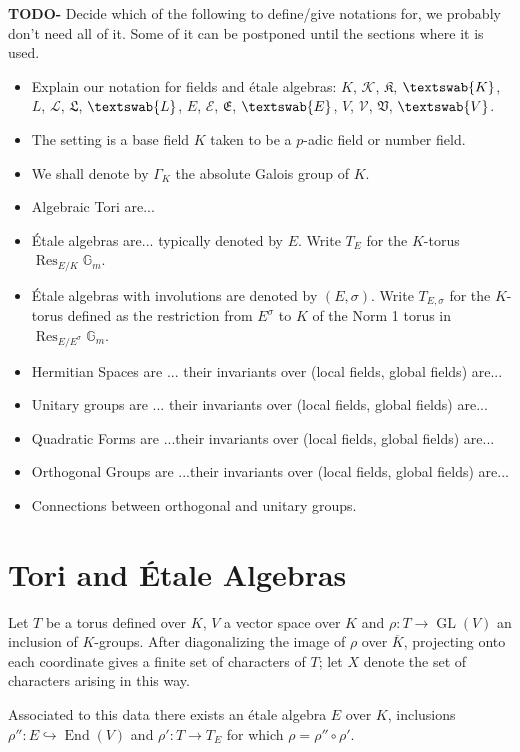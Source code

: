 \documentclass{article}
\theoremstyle{plain}
\theoremstyle{definition}
\DeclareMathOperator{\Res}{Res}
\DeclareMathOperator{\End}{End}
\DeclareMathOperator{\GL}{GL}
\newcommand{\Gm}{\mathbb{G}_m}
\newcommand{\GalKbK}{\Gamma_K}
\newcommand{\Kb}{\overline{K}}
\newcommand{\TODO}[1]{\textbf{TODO-#1}}
\newcommand{\aK}{K}
\newcommand{\gK}{\mathcal{K}}
\newcommand{\lK}{\mathfrak{K}}
\newcommand{\fK}{\textswab{K}}
\newcommand{\aL}{L}
\newcommand{\gL}{\mathcal{L}}
\newcommand{\lL}{\mathfrak{L}}
\newcommand{\fL}{\textswab{L}}
\newcommand{\aE}{E}
\newcommand{\gE}{\mathcal{E}}
\newcommand{\lE}{\mathfrak{E}}
\newcommand{\fE}{\textswab{E}}
\newcommand{\aV}{V}
\newcommand{\gV}{\mathcal{V}}
\newcommand{\lV}{\mathfrak{V}}
\newcommand{\fV}{\textswab{V}}
\begin{document}
\TODO{} Decide which of the following to define/give notations for, we probably don't need all of it. Some of it can be postponed until the sections where it is used.
\begin{itemize}
\item Explain our notation for fields and \'etale algebras: $\aK$, $\gK$, $\lK$, $\fK$, $\aL$, $\gL$, $\lL$, $\fL$, $\aE$, $\gE$, $\lE$, $\fE$, $\aV$, $\gV$, $\lV$, $\fV$.
\item The setting is a base field $K$ taken to be a $p$-adic field or number field.
\item We shall denote by $\GalKbK$ the absolute Galois group of $K$.
\item Algebraic Tori are... 
\item \'Etale algebras are... typically denoted by $E$.  Write $T_E$ for the $K$-torus $\Res_{E/K} \Gm$.
\item \'Etale algebras with involutions are denoted by $(E, \sigma)$.  Write $T_{E, \sigma}$ for the $K$-torus defined as the restriction from $E^\sigma$ to $K$ of the Norm 1 torus in $\Res_{E/E^\sigma} \Gm$.
\item Hermitian Spaces are ... their invariants over (local fields, global fields) are...
\item Unitary groups are ... their invariants over (local fields, global fields) are...
\item Quadratic Forms are ...their invariants over (local fields, global fields) are...
\item Orthogonal Groups are ...their invariants over (local fields, global fields) are...
\item Connections between orthogonal and unitary groups.
\end{itemize}


\section{Tori and \'Etale Algebras}

Let $T$ be a torus defined over $K$, $V$ a vector space over $K$ and $\rho : T \rightarrow \GL(V)$ an inclusion of $K$-groups.  After diagonalizing the image of $\rho$ over $\Kb$, projecting onto each coordinate gives a finite set of characters of $T$; let $X$ denote the set of characters arising in this way. 

Associated to this data there exists an \'etale algebra $E$ over $K$, inclusions $\rho'' : E \hookrightarrow \End(V)$ and $\rho' : T \rightarrow T_E$ for which $\rho = \rho''\circ\rho'$.
\end{document}
